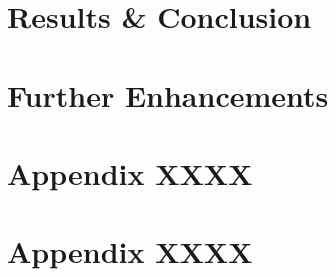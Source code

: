 \documentclass[a4paper]{article}
\begin{document}
\section{Results \& Conclusion}

\section{Further Enhancements}
\clearpage
\section{Appendix XXXX}
\tiny

\clearpage
\section{Appendix XXXX}
\tiny

\end{document}
